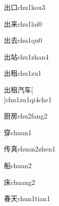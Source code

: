 \begin{verbete}[5;3]{出口}{chu1kou3}
\end{verbete}

\begin{verbete}[5;7]{出来}{chu1lai0}
\end{verbete}

\begin{verbete}[5;5]{出去}{chu1qu0}
\end{verbete}

\begin{verbete}[5;10]{出站}{chu1zhan4}
\end{verbete}

\begin{verbete}[5;10]{出租}{chu1zu1}
\end{verbete}

\begin{verbete}[5;10;7;4]{出租汽车}[\\]{chu1zu1qi4che1}
\end{verbete}

\begin{verbete}[12;8]{厨房}{chu2fang2}
\end{verbete}

\begin{verbete}[9]{穿}{chuan1}
\end{verbete}

\begin{verbete}[6;10]{传真}{chuan2zhen1}
\end{verbete}

\begin{verbete}[11]{船}{chuan2}
\end{verbete}

\begin{verbete}[7]{床}{chuang2}
\end{verbete}

\begin{verbete}[9;4]{春天}{chun1tian1}
\end{verbete}

